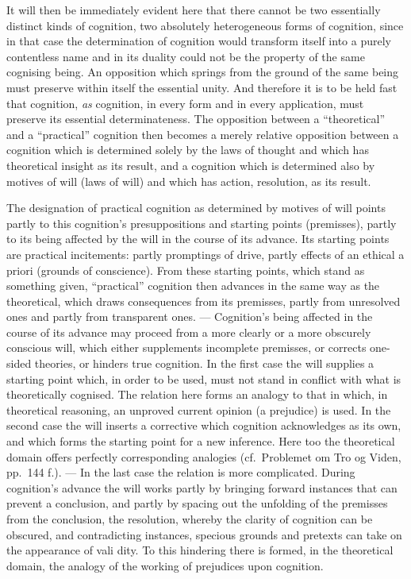 \documentclass[12pt,a4paper]{book}
\begin{document}
It will then be immediately evident here that there cannot be two essentially
distinct kinds of cognition, two absolutely heterogeneous forms of cognition,
since in that case the determination of cognition would transform itself into
a purely contentless name and in its duality could not be the property of the
same cognising being. An opposition which springs from the ground of the same
being must preserve within itself the essential unity. And therefore it is to
be held fast that cognition, \emph{as} cognition, in every form and in every
application, must preserve its essential determinateness.
The opposition between a ``theoretical'' and a ``practical'' cognition then
becomes a merely relative opposition between a cognition which is determined
solely by the laws of thought and which has theoretical insight as its result,
and a cognition which is determined also by motives of will (laws of will) and
which has action, resolution, as its result.

The designation of practical cognition as determined by motives of will points
partly to this cognition's presuppositions and starting points (premisses),
partly to its being affected by the will in the course of its advance. Its
starting points are practical incitements: partly promptings of drive, partly
effects of an ethical a priori (grounds of conscience). From these starting
points, which stand as something given, ``practical'' cognition then advances
in the same way as the theoretical, which draws consequences from its
premisses, partly from unresolved ones and partly from transparent ones. ---
Cognition's being affected in the course of its advance may proceed from a
more clearly or a more obscurely conscious will, which either supplements
incomplete premisses, or corrects one-sided theories, or hinders true
cognition. In the first case the will supplies a starting point which, in
order to be used, must not stand in conflict with what is theoretically
cognised. The relation here forms an analogy to that in which, in theoretical
reasoning, an unproved current opinion (a prejudice) is used. In the second
case the will inserts a corrective which cognition acknowledges as its own,
and which forms the starting point for a new inference. Here too the
theoretical domain offers perfectly corresponding analogies (cf.\ Problemet om
Tro og Viden, pp.\ 144 f.). --- In the last case the relation is more
complicated. During cognition's advance the will works partly by bringing
forward instances that can prevent a conclusion, and partly by spacing out the
unfolding of the premisses from the conclusion, the resolution, whereby the
clarity of cognition can be obscured, and contradicting instances, specious
grounds and pretexts can take on the appearance of vali\-%
dity. To this hindering there is formed, in the theoretical domain, the
analogy of the working of prejudices upon cognition.
\end{document}
